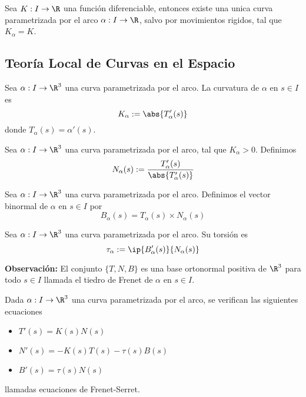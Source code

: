 \documentclass{article}
\begin{document}
\begin{teo}
    Sea $K: I\to\R$ una función diferenciable, entonces existe una unica curva parametrizada por 
    el arco $\alpha: I\to\R$, salvo por movimientos rigidos, tal que $K_{\alpha}=K$.
\end{teo}

\subsection{Teoría Local de Curvas en el Espacio}
\begin{dfn}
    Sea $\alpha: I\to\R^{3}$ una curva parametrizada por el arco. La curvatura de $\alpha$ en 
    $s\in I$ es
    \begin{equation*}
        K_{\alpha}:=\abs{T'_{\alpha}(s)}
    \end{equation*}
    donde $T_{\alpha}(s)=\alpha'(s)$.
\end{dfn}

\begin{dfn}
    Sea $\alpha: I\to\R^{3}$ una curva parametrizada por el arco, tal que $K_{\alpha}>0$. Definimos
    \begin{equation*}
        N_{\alpha}(s):=\frac{T'_{\alpha}(s)}{\abs{T'_{\alpha}(s)}}
    \end{equation*}
\end{dfn}

\begin{dfn}
    Sea $\alpha: I\to\R^{3}$ una curva parametrizada por el arco. Definimos el vector binormal de 
    $\alpha$ en $s\in I$ por
    \begin{equation*}
        B_{\alpha}(s)=T_{\alpha}(s)\times N_{\alpha}(s)
    \end{equation*}
\end{dfn}

\begin{dfn}
    Sea $\alpha: I\to\R^{3}$ una curva parametrizada por el arco. Su torsión es
    \begin{equation*}
        \tau_{\alpha}:=\ip{B'_{\alpha}(s)}{N_{\alpha}(s)}
    \end{equation*}
\end{dfn}

\noindent\textbf{Observación:} El conjunto $\{T,N,B\}$ es una base ortonormal positiva de $\R^{3}$ 
para todo $s\in I$ llamada el tiedro de Frenet de $\alpha$ en $s\in I$.

\begin{prop}
    Dada $\alpha: I\to\R^{3}$ una curva parametrizada por el arco, se verifican las siguientes
    ecuaciones
    \begin{itemize}
        \item $T'(s)=K(s)N(s)$
        \item $N'(s)=-K(s)T(s)-\tau(s) B(s)$
        \item $B'(s)=\tau(s) N(s)$
    \end{itemize}
    llamadas ecuaciones de Frenet-Serret.
\end{prop}
\end{document}
